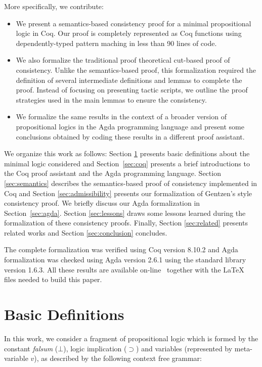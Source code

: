 More specifically, we contribute:


\begin{itemize}
   \item We present a semantics-based consistency proof for a minimal propositional logic in Coq.
   Our proof is completely represented as Coq functions using dependently-typed pattern maching
   in less than 90 lines of code.
   \item We also formalize the traditional proof theoretical cut-based proof of consistency. Unlike the semantics-based
   proof, this formalization required the definition of several intermediate definitions and lemmas to complete the proof.
   Instead of focusing on presenting tactic scripts, we outline the proof strategies used in the main lemmas to ensure
   the consistency.
   \item We formalize the same results in the context of a broader version of propositional logics in the Agda
   programming language and present some conclusions obtained by coding these results in a different proof assistant.
\end{itemize}


We organize this work as follows: Section \ref{sec:definitions} presents basic definitions
about the minimal logic considered and Section~\ref{sec:coq} presents a brief introductions
to the Coq proof assistant and the Agda programming language.
Section \ref{sec:semantics} describes the semantics-based proof of consistency
implemented in  Coq and Section \ref{sec:admissibility} presents our formalization of Gentzen's style consistency proof.
We briefly discuss our Agda formalization in Section~\ref{sec:agda}.
Section \ref{sec:lessons} draws some lessons learned during the formalization of these consistency proofs.
Finally, Section \ref{sec:related} presents related works and Section \ref{sec:conclusion} concludes.


The complete formalization was verified using Coq version 8.10.2 and Agda formalization was checked using Agda version 2.6.1 using the
standard library version 1.6.3. All these results are available on-line~\cite{Sasdelli20} together with the \LaTeX~ files
needed to build this paper.


\section{Basic Definitions}\label{sec:definitions}


In this work, we consider a fragment of propositional logic which is formed by the constant
\emph{falsum} ($\bot$), logic implication ($\supset$) and variables (represented by meta-variable $v$), as
described by the following context free grammar:

